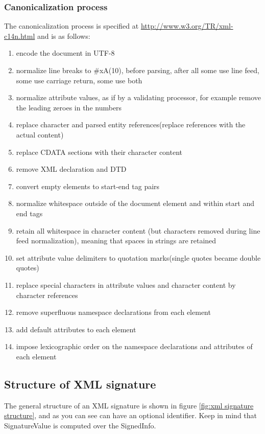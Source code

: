 \subsubsection{Canonicalization process}
The canonicalization process is specified at
\url{http://www.w3.org/TR/xml-c14n.html} and is as follows:
\begin{enumerate}
  \item encode the document in UTF-8
  \item normalize line breaks to \#xA(10), before parsing, after all some
    use line feed, some use carriage return, some use both
  \item normalize attribute values, as if by a validating processor,
    for example remove the leading zeroes in the numbers
  \item replace character and parsed entity references(replace
    references with the actual content)
  \item replace CDATA sections with their character content
  \item remove XML declaration and DTD
  \item convert empty elements to start-end tag pairs
  \item normalize whitespace outside of the document element and
    within start and end tags
  \item retain all whitespace in character content (but characters
    removed during line feed normalization), meaning that spaces in
    strings are retained
  \item set attribute value delimiters to quotation marks(single
    quotes became double quotes)
  \item replace special characters in attribute values and character
    content by character references
  \item remove superfluous namespace declarations from each element
  \item add default attributes to each element
  \item impose lexicographic order on the namespace declarations and
    attributes of each element
\end{enumerate}

\subsection{Structure of XML signature}
The general structure of an XML signature is shown in figure 
\ref{fig:xml signature structure}, and as you can see can have an
optional identifier. Keep in mind that SignatureValue is computed over
the SignedInfo.

